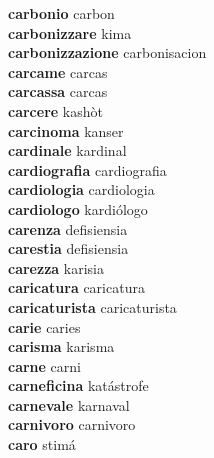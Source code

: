 \textbf{carbonio } carbon \\
\textbf{carbonizzare } kima \\
\textbf{carbonizzazione } carbonisacion \\
\textbf{carcame } carcas \\
\textbf{carcassa } carcas \\
\textbf{carcere } kashòt \\
\textbf{carcinoma } kanser \\
\textbf{cardinale } kardinal \\
\textbf{cardiografia } cardiografia \\
\textbf{cardiologia } cardiologia \\
\textbf{cardiologo } kardiólogo \\
\textbf{carenza } defisiensia \\
\textbf{carestia } defisiensia \\
\textbf{carezza } karisia \\
\textbf{caricatura } caricatura \\
\textbf{caricaturista } caricaturista \\
\textbf{carie } caries \\
\textbf{carisma } karisma \\
\textbf{carne } carni \\
\textbf{carneficina } katástrofe \\
\textbf{carnevale } karnaval \\
\textbf{carnivoro } carnivoro \\
\textbf{caro } stimá \\
